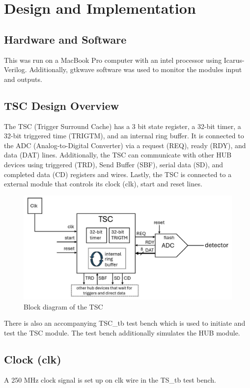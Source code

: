 \section{Design and Implementation }

\subsection{Hardware and Software}
This was run on a MacBook Pro computer with an intel processor using Icarus-Verilog.
Additionally, gtkwave software was used to monitor the modules input and outputs.

\subsection{TSC Design Overview}

The TSC (Trigger Surround Cache) has a 3 bit state register, a 32-bit timer,
a 32-bit triggered time (TRIGTM), and an internal ring buffer.
It is connected to the ADC (Analog-to-Digital Converter)
via a request (REQ), ready (RDY), and data (DAT) lines.
Additionally, the TSC can communicate with other HUB devices using triggered (TRD), Send Buffer (SBF),
serial data (SD), and completed data (CD) registers and wires.
Lastly, the TSC is connected to a external module that controls its clock (clk), start and reset lines.

\begin{figure}[H]
      \centering
      \includegraphics[width=0.8\columnwidth]{Figures/block_diagram_of_TSC}
      \caption{Block diagram of the TSC}
      \label{fig:block diagram of TSC}
\end{figure}

There is also an accompanying TSC\_tb test bench which is used to initiate and test the TSC module.
The test bench additionally simulates the HUB module.

\subsection{Clock (clk)}
A 250 MHz clock signal is set up on clk wire in the TS\_tb test bench.

